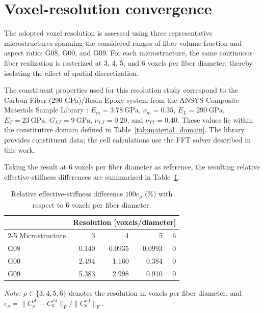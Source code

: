 \documentclass[pdflatex,sn-basic,Numbered]{sn-jnl}
\begin{document}
\section{Voxel-resolution convergence}
\label{app:voxel_resolution}

The adopted voxel resolution is assessed using three representative
microstructures spanning the considered ranges of fiber volume fraction and
aspect ratio: G08, G00, and G09. For each microstructure, the same continuous
fiber realization is rasterized at 3, 4, 5, and 6 voxels per fiber diameter,
thereby isolating the effect of spatial discretization.

The constituent properties used for this resolution study correspond to the
Carbon Fiber (290 GPa)/Resin Epoxy system from the ANSYS Composite Materials
Sample Library \cite{AnsysCompositeMaterials}: \(E_m=3.78~\si{\giga\pascal}\),
\(\nu_m=0.35\), \(E_L=290~\si{\giga\pascal}\),
\(E_T=23~\si{\giga\pascal}\), \(G_{LT}=9~\si{\giga\pascal}\),
\(\nu_{LT}=0.20\), and \(\nu_{TT}=0.40\). These values lie within the
constitutive domain defined in Table~\ref{tab:material_domain}. The library
provides constituent data; the cell calculations use the FFT solver described
in this work.

Taking the result at 6 voxels per fiber diameter as reference, the resulting
relative effective-stiffness differences are summarized in
Table~\ref{tab:voxel_resolution_details}.

\begin{table}[htbp]
\caption{Relative effective-stiffness difference
\(100e_\rho\) (\%) with respect to 6 voxels per fiber diameter.}
\label{tab:voxel_resolution_details}
\begin{tabular}{@{}lrrrr@{}}
\toprule
& \multicolumn{4}{c}{Resolution [voxels/diameter]} \\
\cmidrule(lr){2-5}
Microstructure & 3 & 4 & 5 & 6 \\
\midrule
G08 & 0.140 & 0.0935 & 0.0993 & 0 \\
G00 & 2.494 & 1.160  & 0.384  & 0 \\
G09 & 5.383 & 2.998  & 0.910  & 0 \\
\bottomrule
\end{tabular}
\par\smallskip
\footnotesize\textit{Note:} \(\rho\in\{3,4,5,6\}\) denotes the resolution in
voxels per fiber diameter, and
\(e_\rho=\|C_\rho^{\mathrm{eff}}-C_6^{\mathrm{eff}}\|_F/
\|C_6^{\mathrm{eff}}\|_F\).
\end{table}
\end{document}
